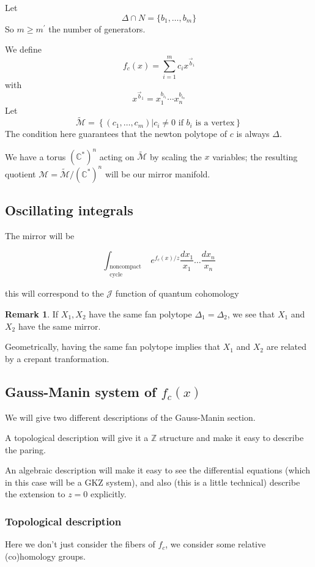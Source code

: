 \documentclass{amsart}
\theoremstyle{definition}
\newtheorem{remark}[dummy]{Remark}
\newcommand{\Z}{\mathbb{Z}}
\newcommand{\J}{\mathcal{J}}
\newcommand{\M}{\mathcal{M}}
\newcommand{\C}{\mathbb{C}}
\begin{document}
Let 
$$\Delta\cap N=\{b_1,\dots,b_m\}$$
So $m\geq m^\prime$ the number of generators.

We define
$$f_c(x)=\sum_{i=1}^m c_ix^{\vec{b}_i}$$
with
$$x^{\vec{b}_1}=x_1^{b_{i_1}}\cdots x_n^{b_{i_n}}$$
Let
$$\tilde{\M}=\left\{(c_1,\dots, c_m)|c_i\neq 0 \text{ if $b_i$ is a vertex}\right\}$$
The condition here guarantees that the newton polytope of $c$ is always $\Delta$.

We have a torus $(\C^*)^n$ acting on $\tilde{\M}$ by scaling the $x$ variables; the resulting quotient $\M=\tilde{\M}/(\C^*)^n$ will be our mirror manifold.

\subsection{Oscillating integrals}
The mirror will be

$$\int_{\substack{\text{noncompact}\\ \text{cycle}}} e^{f_c(x)/z}\frac{dx_1}{x_1}\dots\frac{dx_n}{x_n}$$

this will correspond to the $\J$ function of quantum cohomology

\begin{remark}
If $X_1, X_2$ have the same fan polytope $\Delta_1=\Delta_2$, we see that $X_1$ and $X_2$ have the same mirror.  

Geometrically, having the same fan polytope implies that $X_1$ and $X_2$ are related by a crepant tranformation.
\end{remark}

\subsection{Gauss-Manin system of $f_c(x)$}
We will give two different descriptions of the Gauss-Manin section.

A topological description will give it a $\Z$ structure and make it easy to describe the paring.

An algebraic description will make it easy to see the differential equations (which in this case will be a GKZ system), and also (this is a little technical) describe the extension to $z=0$ explicitly.

\subsubsection{Topological description}


Here we don't just consider the fibers of $f_c$, we consider some relative (co)homology groups.  
\end{document}
